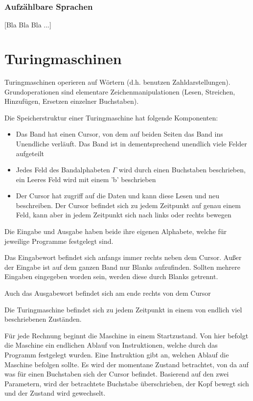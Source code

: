 \documentclass[12pt,a4paper]{article} %
\begin{document}
	\subsubsection{Aufzählbare Sprachen}
	
	
	[Bla Bla Bla ...]
	\section{Turingmaschinen}
	Turingmaschinen operieren auf Wörtern (d.h. benutzen Zahldarstellungen).
	Grundoperationen sind elementare Zeichenmanipulationen (Lesen, Streichen, Hinzufügen, Ersetzen einzelner Buchstaben).
	
	Die Speicherstruktur einer Turingmaschine hat folgende Komponenten:
	
	\begin{itemize}
		\item Das Band hat einen Cursor, von dem auf beiden Seiten das Band ins Unendliche verläuft. Das Band ist in dementsprechend unendlich viele Felder aufgeteilt
		\item Jedes Feld des Bandalphabeten $\Gamma$ wird durch einen Buchstaben beschrieben, ein Leeres Feld wird mit einem 'b' beschrieben
		\item Der Cursor hat zugriff auf die Daten und kann diese Lesen und neu beschreiben. Der Cursor befindet sich zu jedem Zeitpunkt auf genau einem Feld, kann aber in jedem Zeitpunkt sich nach links oder rechts bewegen 
	\end{itemize}
	
	Die Eingabe und Ausgabe haben beide ihre eigenen Alphabete, welche für jeweilige Programme festgelegt sind. 
	
	Das Eingabewort befindet sich anfangs immer rechts neben dem Cursor. Außer der Eingabe ist auf dem ganzen Band nur Blanks aufzufinden. Sollten mehrere Eingaben eingegeben worden sein, werden diese durch Blanks getrennt.
	
	Auch das Ausgabewort befindet sich am ende rechts von dem Cursor
	
	Die Turingmaschine befindet sich zu jedem Zeitpunkt in einem von endlich viel beschriebenen Zuständen. 
	
	Für jede Rechnung beginnt die Maschine in einem Startzustand. Von hier befolgt die Maschine ein endlichen Ablauf von Instruktionen, welche durch das Programm festgelegt wurden. Eine Instruktion gibt an, welchen Ablauf die Maschine befolgen sollte. Es wird der momentane Zustand betrachtet, von da auf was für einen Buchstaben sich der Cursor befindet. Basierend auf den zwei Parametern, wird der betrachtete Buchstabe überschrieben, der Kopf bewegt sich und der Zustand wird gewechselt.
	
\end{document}
